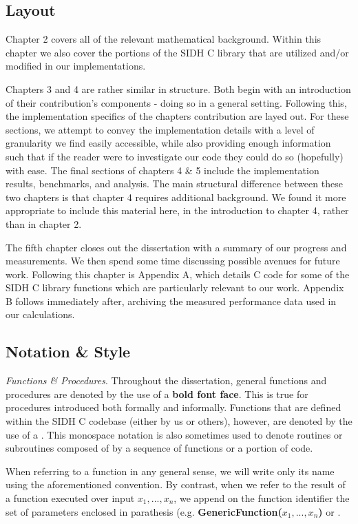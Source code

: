 \subsection{Layout}

Chapter 2 covers all of the relevant mathematical background. Within this chapter we also cover the portions of the SIDH C library that are utilized and/or modified in our implementations.

Chapters 3 and 4 are rather similar in structure. Both begin with an introduction of their contribution's components - doing so in a general setting. Following this, the implementation specifics of the chapters contribution are layed out. For these sections, we attempt to convey the implementation details with a level of granularity we find easily accessible, while also providing enough information such that if the reader were to investigate our code they could do so (hopefully) with ease. The final sections of chapters 4 \& 5 include the implementation results, benchmarks, and analysis. The main structural difference between these two chapters is that chapter 4 requires additional background. We found it more appropriate to include this material here, in the introduction to chapter 4, rather than in chapter 2.

The fifth chapter closes out the dissertation with a summary of our progress and measurements. We then spend some time discussing possible avenues for future work. Following this chapter is Appendix A, which details C code for some of the SIDH C library functions which are particularly relevant to our work. Appendix B follows immediately after, archiving the measured performance data used in our calculations.

\subsection{Notation \& Style}

\noindent
\textit{Functions \& Procedures}. Throughout the dissertation, general functions and procedures are denoted by the use of a \textbf{bold font face}. This is true for procedures introduced both formally and informally. Functions that are defined within the SIDH C codebase (either by us or others), however, are denoted by the use of a . This monospace notation is also sometimes used to denote routines or subroutines composed of by a sequence of functions or a portion of code.

When referring to a function in any general sense, we will write only its name using the aforementioned convention. By contrast, when we refer to the result of a function executed over input $x_{1}, ..., x_{n}$, we append on the function identifier the set of parameters enclosed in parathesis (e.g. \textbf{GenericFunction($x_{1}, ..., x_{n}$)} or .

